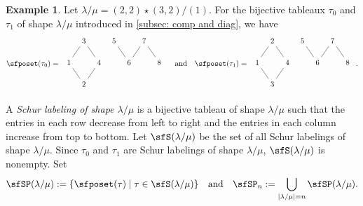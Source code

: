 \documentclass[12pt, reqno]{amsart}
\theoremstyle{definition}
\newtheorem{example}[theorem]{Example}
\numberwithin{equation}{section} \numberwithin{figure}{section}
\numberwithin{table}{section}
\begin{document}
\begin{example}
Let $\lambda / \mu = (2,2) \star (3,2) / (1)$.
For the bijective tableaux 
$\tau_0$ and $\tau_1$ of shape $\lambda/\mu$
introduced in \cref{subsec: comp and diag}, we have
\[
\def \pp {1}
\def \hp {0.7}
\sfposet(\tau_0) = 
\begin{array}{l}
\begin{tikzpicture}
\node at (0,0) {1};
\node at (1*\hp, -1*\pp) {2};
\node at (1*\hp, 1*\pp) {3};
\node at (2*\hp, 0*\pp) {4};

\node at (3*\hp, 1*\pp) {5};
\node at (4*\hp, 0*\pp) {6};
\node at (5*\hp, 1*\pp) {7};
\node at (6*\hp, 0*\pp) {8};

\draw (0.25*\hp, -0.25*\pp) -- (0.75*\hp, -0.75*\pp);
\draw (1.25*\hp, -0.75*\pp) -- (1.75*\hp, -0.25*\pp);
\draw (0.25*\hp, 0.25*\pp) -- (0.75*\hp, 0.75*\pp);
\draw (1.25*\hp, 0.75*\pp) -- (1.75*\hp, 0.25*\pp);
\draw (3.25*\hp, 0.75*\pp) -- (3.75*\hp, 0.25*\pp);
\draw (4.25*\hp, 0.25*\pp) -- (4.75*\hp, 0.75*\pp);
\draw (5.25*\hp, 0.75*\pp) -- (5.75*\hp, 0.25*\pp);
\end{tikzpicture}
\end{array}
\quad \text{and} \quad
\sfposet(\tau_1) = 
\begin{array}{l}
\begin{tikzpicture}
\node at (0,0) {1};
\node at (1*\hp, -1*\pp) {3};
\node at (1*\hp, 1*\pp) {2};
\node at (2*\hp, 0*\pp) {4};

\node at (3*\hp, 1*\pp) {5};
\node at (4*\hp, 0*\pp) {6};
\node at (5*\hp, 1*\pp) {7};
\node at (6*\hp, 0*\pp) {8};

\draw (0.25*\hp, -0.25*\pp) -- (0.75*\hp, -0.75*\pp);
\draw (1.25*\hp, -0.75*\pp) -- (1.75*\hp, -0.25*\pp);
\draw (0.25*\hp, 0.25*\pp) -- (0.75*\hp, 0.75*\pp);
\draw (1.25*\hp, 0.75*\pp) -- (1.75*\hp, 0.25*\pp);
\draw (3.25*\hp, 0.75*\pp) -- (3.75*\hp, 0.25*\pp);
\draw (4.25*\hp, 0.25*\pp) -- (4.75*\hp, 0.75*\pp);
\draw (5.25*\hp, 0.75*\pp) -- (5.75*\hp, 0.25*\pp);
\end{tikzpicture}
\end{array}.
\]
\end{example}
A \emph{Schur labeling of shape $\lambda/ \mu$} is a bijective tableau of shape $\lambda / \mu$ such that
the entries in each row decrease from left to right and the entries in each column increase from top to bottom.
Let $\sfS(\lambda/\mu)$ be the set of all Schur labelings of shape $\lambda / \mu$. 
Since $\tau_0$ and $\tau_1$ are Schur labelings of shape $\lambda/\mu$, $\sfS(\lambda/\mu)$ is nonempty.
Set
\[
\sfSP(\lambda/\mu) := \{\sfposet(\tau) \mid \tau \in \sfS(\lambda/\mu)
\}
\quad \text{and} \quad
\sfSP_n := \bigcup_{
|\lambda/\mu| = n
} \sfSP(\lambda/\mu).
\]
\end{document}
